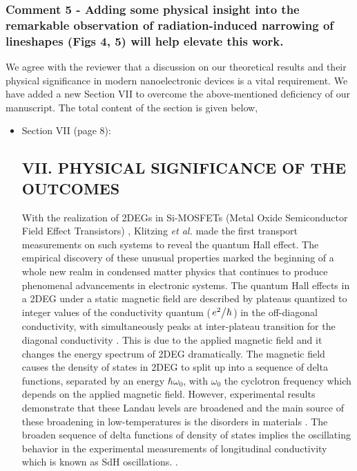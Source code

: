 \documentclass{article}
\begin{document}
\subsubsection*{Comment 5 -
\color{RoyalBlue} Adding some physical insight into the remarkable observation of radiation-induced narrowing of lineshapes (Figs 4, 5) will help elevate
this work.
}

We agree with the reviewer that a discussion on our theoretical results and their physical significance in modern nanoelectronic devices is a vital requirement. We have added a new Section VII to overcome the above-mentioned deficiency of our manuscript. The total content of the section is given below,

\begin{itemize}
  \item Section VII (page 8):\\
  {\color{Red}
  \subsection*{VII. PHYSICAL SIGNIFICANCE OF THE OUTCOMES}

  With the realization of 2DEGs in Si-MOSFETs (Metal Oxide Semiconductor Field Effect Transistors) \citep{fowler66}, Klitzing \textit{et al.} \cite{klitzing80} made the first transport measurements on such systems to reveal the quantum Hall effect. The empirical discovery of these unusual properties marked the beginning of a whole new realm in condensed matter physics that continues to produce phenomenal advancements in electronic systems. The quantum Hall effects in a 2DEG under a static magnetic field are described by plateaus quantized to integer values of the conductivity quantum ($\flatfrac{e^2}{\hbar}$) in the off-diagonal conductivity, with simultaneously peaks at inter-plateau transition for the diagonal conductivity \cite{endo09}. This is due to the applied magnetic field and it changes the energy spectrum of 2DEG dramatically. The magnetic field causes the density of states in 2DEG to split up into a sequence of delta functions, separated by an energy $\hbar\omega_0$, with $\omega_0$ the cyclotron frequency which depends on the applied magnetic field.
  However, experimental results demonstrate that these Landau levels are broadened and the main source of these broadening in low-temperatures is the disorders in materials \cite{ando85,dial07}. The broaden sequence of delta functions of density of states implies the oscillating behavior in the experimental measurements of longitudinal conductivity which is known as SdH oscillations. \cite{endo09,wakabayashi78}.

}
\end{itemize}
\end{document}

